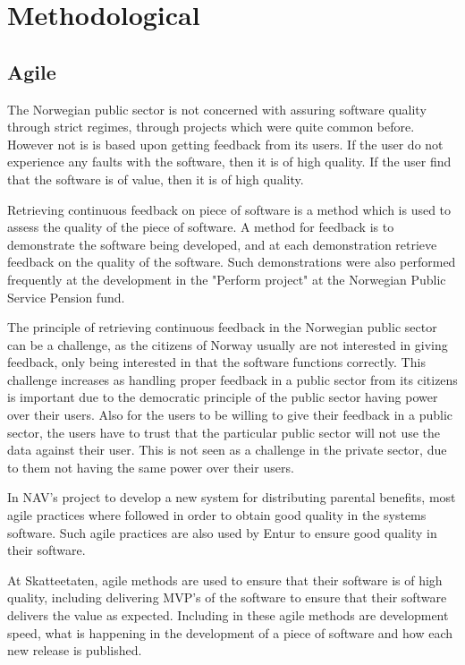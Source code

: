 \section{Methodological}
\subsection{Agile}
The Norwegian public sector is not concerned with assuring software quality through strict regimes, through projects which were quite common before. However not is is based upon getting feedback from its users. If the user do not experience any faults with the software, then it is of high quality. If the user find that the software is of value, then it is of high quality.

Retrieving continuous feedback on piece of software is a method which is used to assess the quality of the piece of software. A method for feedback is to demonstrate the software being developed, and at each demonstration retrieve feedback on the quality of the software. Such demonstrations were also performed frequently at the development in the "Perform project" at the Norwegian Public Service Pension fund.

The principle of retrieving continuous feedback in the Norwegian public sector can be a challenge, as the citizens of Norway usually are not interested in giving feedback, only being interested in that the software functions correctly. This challenge increases as handling proper feedback in a public sector from its citizens is important due to the democratic principle of the public sector having power over their users. Also for the users to be willing to give their feedback in a public sector, the users have to trust that the particular public sector will not use the data against their user. This is not seen as a challenge in the private sector, due to them not having the same power over their users.

In NAV's project to develop a new system for distributing parental benefits, most agile practices where followed in order to obtain good quality in the systems software. Such agile practices are also used by Entur to ensure good quality in their software.

At Skatteetaten, agile methods are used to ensure that their software is of high quality, including delivering MVP's of the software to ensure that their software delivers the value as expected. Including in these agile methods are development speed, what is happening in the development of a piece of software and how each new release is published. 

